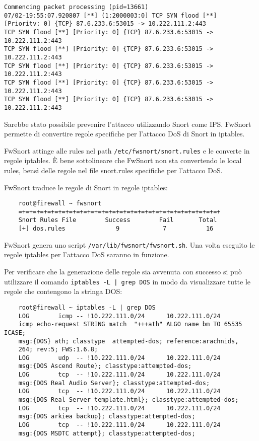 \begin{verbatim}
Commencing packet processing (pid=13661)
07/02-19:55:07.920807 [**] (1:2000003:0] TCP SYN flood [**] 
[Prioritv: 0] {TCP} 87.6.233.6:53015 -> 10.222.111.2:443
TCP SYN flood [**] [Priority: 0] {TCP} 87.6.233.6:53015 -> 10.222.111.2:443  
TCP SYN flood [**] [Priority: 0] {TCP} 87.6.233.6:53015 -> 10.222.111.2:443
TCP SYN flood [**] [Priority: 0] {TCP} 87.6.233.6:53015 -> 10.222.111.2:443
TCP SYN flood [**] [Priority: 0] {TCP} 87.6.233.6:53015 -> 10.222.111.2:443
TCP SYN flood [**] [Priority: 0] {TCP} 87.6.233.6:53015 -> 10.222.111.2:443
\end{verbatim}

Sarebbe stato possibile prevenire l'attacco utilizzando Snort come IPS. FwSnort permette di convertire regole specifiche per l'attacco DoS di Snort in iptables.

FwSnort attinge alle rules nel path \texttt{/etc/fwsnort/snort.rules} e le converte in regole iptables. È bene sottolineare che FwSnort non sta convertendo le local rules, bensì delle regole nel file snort.rules specifiche per l'attacco DoS.

FwSnort traduce le regole di Snort in regole iptables:

\begin{verbatim}
    root@firewall ~ fwsnort
    =+=+=+=+=+=+=+=+=+=+=+=+=+=+=+=+=+=+=+=+=+=+=+=+=+=+=+=+
    Snort Rules File        Success        Fail       Total
    [+] dos.rules              9            7           16
\end{verbatim}

FwSnort genera uno script \texttt{/var/lib/fwsnort/fwsnort.sh}. Una volta eseguito le regole iptables per l'attacco DoS saranno in funzione.

Per verificare che la generazione delle regole sia avvenuta con successo si può utilizzare il comando \texttt{iptables -L | grep DOS} in modo da visualizzare tutte le regole che contengono la stringa DOS:

\begin{verbatim}
    root@firewall ~ iptables -L | grep DOS
    LOG        icmp -- !10.222.111.0/24      10.222.111.0/24   
    icmp echo-request STRING match  "+++ath" ALGO name bm TO 65535 ICASE;
    msg:{DOS} ath; classtype  attempted-dos; reference:arachnids,
    264; rev:5; FWS:1.6.8;
    LOG        udp  -- !10.222.111.0/24      10.222.111.0/24  
    msg:{DOS Ascend Route}; classtype:attempted-dos; 
    LOG        tcp  -- !10.222.111.0/24      10.222.111.0/24    
    msg:{DOS Real Audio Server}; classtype:attempted-dos; 
    LOG        tcp  -- !10.222.111.0/24      10.222.111.0/24    
    msg:{DOS Real Server template.html}; classtype:attempted-dos; 
    LOG        tcp  -- !10.222.111.0/24      10.222.111.0/24    
    msg:{DOS arkiea backup}; classtype:attempted-dos; 
    LOG        tcp  -- !10.222.111.0/24      10.222.111.0/24   
    msg:{DOS MSDTC attempt}; classtype:attempted-dos; 
\end{verbatim}

